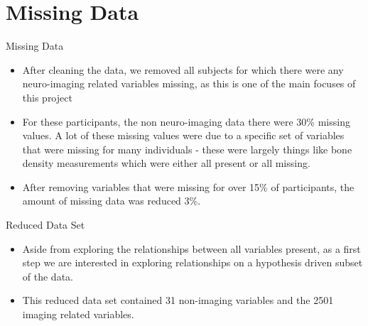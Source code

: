 \documentclass[10pt]{beamer} %
\begin{document}
\section{Missing Data}
\begin{frame}[plain]{Missing Data}
\begin{itemize}

\item After cleaning the data, we removed all subjects for which there were any neuro-imaging related variables missing, as this is one of the main focuses of this project

\vspace{0.4cm}


\item For these participants, the non neuro-imaging data there were 30\% missing values. A lot of these missing values were due to a specific set of variables that were missing for many individuals - these were largely things like bone density measurements which were either all present or all missing.

\vspace{0.4cm}


\item After removing variables that were missing for over 15\% of participants, the amount of missing data was reduced 3\%.

\end{itemize}

\end{frame}


\begin{frame}[plain]{Reduced Data Set}
\begin{itemize}

\item Aside from exploring the relationships between all variables present, as a first step we are interested in exploring relationships on a hypothesis driven subset of the data. 

\vspace{0.5cm}


\item This reduced data set contained 31 non-imaging variables and the 2501 imaging related variables.

\end{itemize}

\end{frame}



\end{document}
